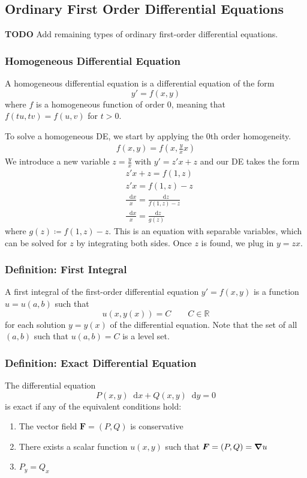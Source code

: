 \documentclass[11pt, a4paper]{article}
\newcommand{\diff}{\mathop{}\!\mathrm{d}} %
\newcommand{\R}{\mathbb{R}} %
\begin{document}
\subsection{Ordinary First Order Differential Equations}
\textbf{TODO} Add remaining types of ordinary first-order differential equations. 
\subsubsection{Homogeneous Differential Equation}
A homogeneous differential equation is a differential equation of the form
\begin{equation*}
	y' = f(x,y)
\end{equation*}
where $ f $ is a homogeneous function of order $ 0 $, meaning that $ f(tu, tv) = f(u, v) $ for $ t > 0 $.

To solve a homogeneous DE, we start by applying the $ 0 $th order homogeneity.
\begin{align*}
	f(x, y) = f\left(x, \frac{y}{x}x \right)
\end{align*}
We introduce a new variable $ z = \frac{y}{x} $ with $ y' = z'x + z $ and our DE takes the form
\begin{align*}
	&z'x + z = f(1, z)\\
	&z'x = f(1, z) - z\\
	&\frac{\diff x}{x} = \frac{\diff z}{f(1, z) - z}\\
	& \frac{\diff x}{x} = \frac{\diff z}{g(z)}
\end{align*}
where $ g(z) \coloneqq f(1, z) - z $. This is an equation with separable variables, which can be solved for $ z $ by integrating both sides. Once $ z $ is found, we plug in $ y = zx $.


\subsubsection{Definition: First Integral}
A first integral of the first-order differential equation $ y' = f(x, y) $ is a function $ u = u(a, b) $ such that 
\begin{equation*}
	u(x, y(x)) = C \qquad C \in \R
\end{equation*}
for each solution $ y = y(x) $ of the differential equation. Note that the set of all $ (a, b) $ such that $ u(a, b) = C $ is a level set.

\subsubsection{Definition: Exact Differential Equation}
The differential equation
\begin{equation*}
	P(x, y) \diff x + Q(x, y) \diff y = 0
\end{equation*}
is exact if any of the equivalent conditions hold:
\begin{enumerate}
	\item The vector field $ \bm{F} = (P, Q) $ is conservative
	\item There exists a scalar function $ u(x, y) $ such that $ \bm{F} = (P, Q)  = \grad{u}$
	\item $ P_y = Q_x $
\end{enumerate} 
\end{document}
